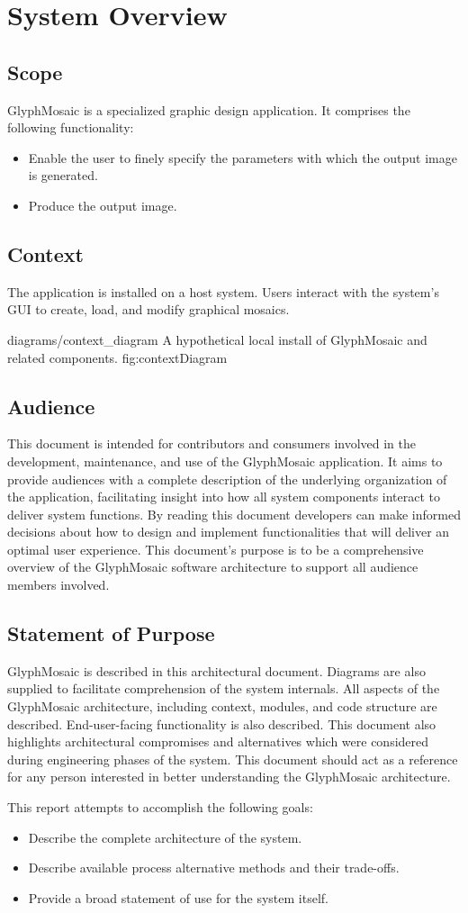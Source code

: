 \section{System Overview}
\subsection{Scope}
GlyphMosaic is a specialized graphic design application.
It comprises the following functionality:
\begin{itemize}
  \item Enable the user to finely specify the parameters with which the output image is generated.
  \item Produce the output image.
\end{itemize}


\subsection{Context}
The application is installed on a host system.
Users interact with the system's GUI to create, load, and modify graphical mosaics.

\sidiagram
{diagrams/context_diagram}
{A hypothetical local install of GlyphMosaic and related components.}
{fig:contextDiagram}
{\diagsize}


\subsection{Audience}
This document is intended for contributors and consumers involved in the development, maintenance, and use of the GlyphMosaic application.
It aims to provide audiences with a complete description of the underlying organization of the application, facilitating insight into how all system components interact to deliver system functions.
By reading this document developers can make informed decisions about how to design and implement functionalities that will deliver an optimal user experience.
This document's purpose is to be a comprehensive overview of the GlyphMosaic software architecture to support all audience members involved.


\subsection{Statement of Purpose}
GlyphMosaic is described in this architectural document.
Diagrams are also supplied to facilitate comprehension of the system internals.
All aspects of the GlyphMosaic architecture, including context, modules, and code structure are described.
End-user-facing functionality is also described.
This document also highlights architectural compromises and alternatives which were considered during engineering phases of the system.
This document should act as a reference for any person interested in better understanding the GlyphMosaic architecture.

This report attempts to accomplish the following goals:
\begin{itemize}
  \item Describe the complete architecture of the system.
  \item Describe available process alternative methods and their trade-offs.
  \item Provide a broad statement of use for the system itself.
\end{itemize}